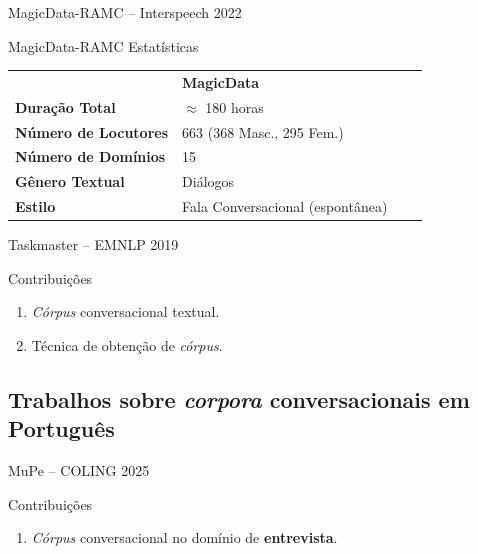 \begin{frame}{MagicData-RAMC -- Interspeech 2022}
  \begin{block}{MagicData-RAMC Estatísticas}
    \begin{table}[ht]
      \centering
      \label{tab:MagicData}
      \small
      \begin{tabular}{@{}llll@{}}
        & \textbf{MagicData} \\
        \textbf{Duração Total}  & $\approx$ 180 horas \\
        \textbf{Número de Locutores} & 663 (368 Masc., 295 Fem.) \\
        \textbf{Número de Domínios} & 15 \\
        \textbf{Gênero Textual} & Diálogos \\
        \textbf{Estilo} & Fala Conversacional (espontânea)  \\
      \end{tabular}
    \end{table}
  \end{block}
\end{frame}

\begin{frame}{Taskmaster -- EMNLP 2019}
  \begin{block}{Contribuições}
    \begin{enumerate}
      \item \textit{Córpus} conversacional textual.
      \item Técnica de obtenção de \textit{córpus}.
    \end{enumerate}
  \end{block}
\end{frame}

\subsection[PT]{Trabalhos sobre \textit{corpora} conversacionais em Português}

\begin{frame}{MuPe -- COLING 2025}
  \begin{block}{Contribuições}
    \begin{enumerate}
      \item \textit{Córpus} conversacional no domínio de \textbf{entrevista}.
    \end{enumerate}
  \end{block}
\end{frame}


